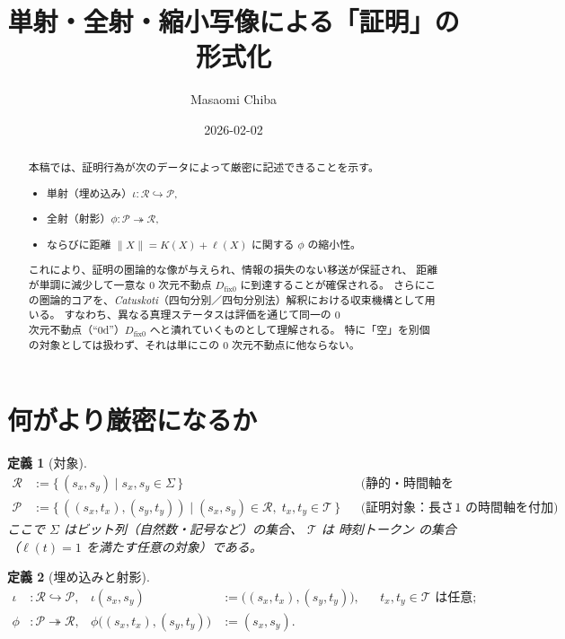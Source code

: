 \documentclass[12pt,a4paper]{article}
\newcommand{\dfix}{D_{\mathrm{fix}0}} %
\newcommand{\Rep}{\mathcal{R}}           %
\newcommand{\Prf}{\mathcal{P}}           %
\newcommand{\Tset}{\mathcal{T}}          %
\newtheorem{definition}{定義}[section]
\begin{document}
\title{単射・全射・縮小写像による「証明」の形式化}
\author{Masaomi Chiba}
\date{2026-02-02}
\maketitle

\begin{abstract}
本稿では、証明行為が次のデータによって厳密に記述できることを示す。
\begin{itemize}[nosep]
  \item 単射（埋め込み）$\iota\colon\Rep\hookrightarrow\Prf$,
  \item 全射（射影）$\phi\colon\Prf\twoheadrightarrow\Rep$,
  \item ならびに距離 $\|X\|=K(X)+\ell(X)$ に関する $\phi$ の縮小性。
\end{itemize}
これにより、証明の圏論的な像が与えられ、情報の損失のない移送が保証され、
距離が単調に減少して一意な $0$ 次元不動点 $\dfix$ に到達することが確保される。
さらにこの圏論的コアを、\emph{Catuskoti}（四句分別／四句分別法）解釈における収束機構として用いる。
すなわち、異なる真理ステータスは評価を通じて同一の $0$ 次元不動点（``0d''）$\dfix$ へと潰れていくものとして理解される。
特に「空」を別個の対象としては扱わず、それは単にこの $0$ 次元不動点に他ならない。
\end{abstract}

\section{何がより厳密になるか}

\begin{definition}[対象]
$$
\begin{aligned}
\Rep &:= \{\, (s_x,s_y)\mid s_x,s_y\in\Sigma \,\}
      &&\text{(静的・時間軸を持たない情報)}\\[2mm]
\Prf &:= \{\, ((s_x,t_x),(s_y,t_y))
          \mid (s_x,s_y)\in\Rep,\;t_x,t_y\in\Tset \,\}
      &&\text{(証明対象：長さ $1$ の時間軸を付加)} .
\end{aligned}
$$
ここで $\Sigma$ はビット列（自然数・記号など）の集合、
$\Tset$ は \emph{時刻トークン} の集合（$\ell(t)=1$ を満たす任意の対象）である。
\end{definition}

\begin{definition}[埋め込みと射影]
$$
\begin{aligned}
\iota &: \Rep\hookrightarrow\Prf,
        &\iota(s_x,s_y)&:=\bigl((s_x,t_x),(s_y,t_y)\bigr),
        &&t_x,t_y\in\Tset\text{ は任意};\\[2mm]
\phi &: \Prf\twoheadrightarrow\Rep,
        &\phi\bigl((s_x,t_x),(s_y,t_y)\bigr)&:=(s_x,s_y).
\end{aligned}
$$
\end{definition}
\end{document}
